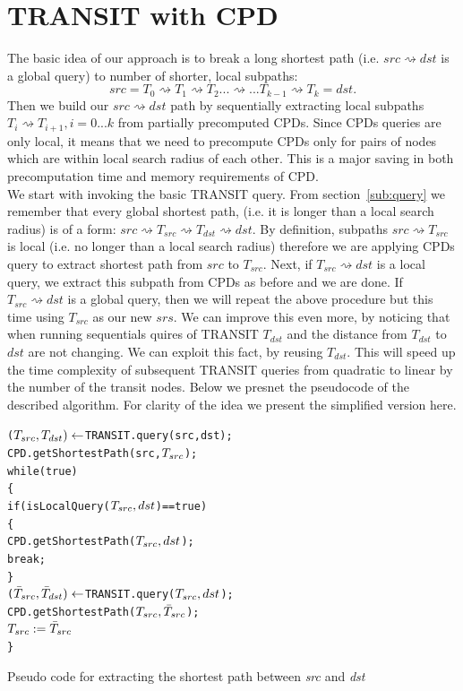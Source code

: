\documentclass[runningheads,a4paper]{llncs}
\begin{document}
\section{TRANSIT with CPD}\label{sec:transit_cpd}
The basic idea of our approach is to break a long shortest path (i.e. $src \rightsquigarrow dst$ is a global query)  
to number of shorter, local subpaths: $$src=T_0 \rightsquigarrow T_1 \rightsquigarrow T_2 ...\rightsquigarrow... T_{k-1} \rightsquigarrow T_{k}=dst.$$
Then we build our $src \rightsquigarrow dst$ path by sequentially extracting local subpaths $T_i \rightsquigarrow T_{i+1}, i=0...k$ from partially precomputed CPDs.
Since CPDs queries are only local, it means that we need to precompute CPDs only for pairs of nodes which are within local search radius of each other.
This is a major saving in both precomputation time and memory requirements of CPD.
\\
We start with invoking the basic TRANSIT query. From section~\ref{sub:query} we remember that every global shortest path,
(i.e. it is longer than a local search radius) is of a form: $src \rightsquigarrow T_{src} \rightsquigarrow T_{dst} \rightsquigarrow dst$. 
By definition, subpaths $src \rightsquigarrow T_{src}$ is local (i.e. no longer than a local search radius)
therefore we are applying CPDs query to extract shortest path from $src$ to $T_{src}$. Next, if $T_{src} \rightsquigarrow dst$ is a local query,
we extract this subpath from CPDs as before and we are done. 
If $T_{src} \rightsquigarrow dst$ is a global query, then we will repeat the above procedure 
but this time using $T_{src}$ as our new $srs$. We can improve this even more, by noticing that when running sequentials quires of TRANSIT $T_{dst}$
and the distance from $T_{dst}$ to $dst$ are not changing. We can exploit this fact, by reusing $T_{dst}$. This will speed up the time complexity 
of subsequent TRANSIT queries from quadratic to linear by the number of the transit nodes.
Below we presnet the pseudocode of the described algorithm. For clarity of the idea we present the simplified version here.
\begin{algorithm}
\begin{alltt}

   (\(T\sb{src}, T\sb{dst}) \leftarrow \) TRANSIT.query(src, dst);
   CPD.getShortestPath(src, \(T\sb{src}\));  
   while (true)                       
   \{
      if (isLocalQuery(\(T\sb{src}, dst\)) == true)
      \{
         CPD.getShortestPath(\(T\sb{src}, dst\));
         break;
      \}
      (\(\bar{T}\sb{src}, \bar{T}\sb{dst}) \leftarrow \) TRANSIT.query(\(T\sb{src}, dst\));
      CPD.getShortestPath(\(T\sb{src}, \bar{T}\sb{src}\));
      \(T\sb{src} := \bar{T}\sb{src}\)  
   \}

\end{alltt}
\caption{Pseudo code for extracting the shortest path between \textit{src} and \textit{dst}} \label{alg:transit_cpd_pseudo}
\end{algorithm}
\end{document}

